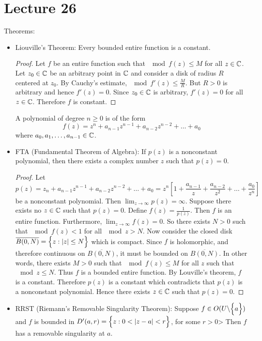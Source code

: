\documentclass[12pt]{article}
\begin{document}
\section{Lecture 26} 
Theorems: \begin{itemize} 
\item Liouville's Theorem: Every bounded entire function is a constant. 
\begin{proof} Let $f$ be an entire function such that $\mod{f(z)} \leq M$ for all $z \in \mathbb{C}$. Let $z_0 \in \mathbb{C}$ be an arbitrary point in $\mathbb{C}$ and consider a disk of radius $R$ centered at $z_0$. By Cauchy's estimate, $\mod{f'(z)} \leq \frac{M}{R}$. But $R > 0$ is arbitrary and hence $f'(z) = 0$. Since $z_0 \in \mathbb{C}$ is arbitrary, $f'(z) = 0$ for all $z \in \mathbb{C}$. Therefore $f$ is constant. \end{proof} 
A polynomial of degree $n \geq 0$ is of the form $$f(z) = z^n + a_{n-1}z^{n-1} + a_{n-2}z^{n-2} + \dots + a_0$$ where $a_0,a_1,\dots,a_{n-1} \in \mathbb{C}$. 
\item FTA (Fundamental Theorem of Algebra): If $p(z)$ is a nonconstant polynomial, then there exists a complex number $z$ such that $p(z) = 0$. 
\begin{proof} Let $$p(z) = z_n + a_{n-1}z^{n-1} + a_{n-2}z^{n-2} + \dots + a_0 = z^n[1 + \frac{a_{n-1}}{z} + \frac{a_{n-2}}{z^2} + \dots + \frac{a_0}{z^n}] $$ be a nonconstant polynomial. Then $\lim_{z\to \infty} p(z) = \infty$. Suppose there exists no $z \in \mathbb{C}$ such that $p(z) = 0$. Define $f(z) = \frac{1}{p(z)}$. Then $f$ is an entire function. Furthermore, $\lim_{z\to\infty} f(z) = 0$. So there exists $N > 0$ such that $\mod{f(z)} < 1$ for all $\mod{z} > N$. Now consider the closed disk $\overline{B(0,N)} = \Big\{ z: \abs{z} \leq N \Big\}$ which is compact. Since $f$ is holomorphic, and therefore continuous on $\overline{B(0,N)}$, it must be bounded on $\overline{B(0,N)}$. In other words, there exists $M > 0$ such that $\mod{f(z)} \leq M$ for all $z$ such that $\mod{z} \leq N$. Thus $f$ is a bounded entire function. By Louville's theorem, $f$ is a constant. Therefore $p(z)$ is a constant which contradicts that $p(z)$ is a nonconstant polynomial. Hence there exists $z \in \mathbb{C}$ such that $p(z) = 0$. \end{proof}
\item RRST (Riemann's Removable Singularity Theorem): Suppose $f \in O(U \backslash \Big\{ a \Big\})$ and $f$ is bounded in $D'(a,r) = \Big\{ z: 0 < \abs{z-a} < r \Big\}$, for some $r>0$> Then $f$ has a removable singularity at $a$. 

\end{itemize}
\end{document}
